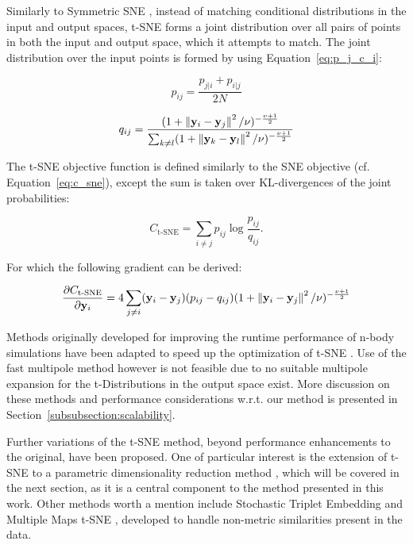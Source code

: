 Similarly to Symmetric SNE \cite{symmetric_sne}, instead of matching conditional distributions in the input and output spaces, t-SNE forms a joint distribution over all pairs of points in both the input and output space, which it attempts to match. The joint distribution over the input points is formed by using Equation~\ref{eq:p_j_c_i}:

$$p_{ij} = \frac{p_{j \vert i} + p_{i \vert j}}{2 N}$$

$$q_{ij} = \frac{(1 + \left\lVert\mathbf{y}_i - \mathbf{y}_j\right\rVert^2 / \nu)^{-\frac{\nu + 1}{2}}}{\sum_{k \neq l} (1 + \left\lVert\mathbf{y}_k - \mathbf{y}_l\right\rVert^2 / \nu)^{-\frac{\nu + 1}{2}}}$$

The t-SNE objective function is defined similarly to the SNE objective (cf. Equation~\ref{eq:c_sne}), except the sum is taken over KL-divergences of the joint probabilities:

$$C_{\text{t-SNE}} = \sum_{i \neq j} p_{ij} \log \frac{p_{ij}}{q_{ij}}.$$

For which the following gradient can be derived:

\begin{equation}
\frac{\partial C_{\text{t-SNE}}}{\partial \mathbf{y}_i} = 4 \sum_{j \neq i} (\mathbf{y}_i - \mathbf{y}_j)(p_{ij} - q_{ij})(1 + \left\lVert\mathbf{y}_i - \mathbf{y}_j\right\rVert^2 / \nu)^{-\frac{\nu + 1}{2}}
\label{eq:c_tsne_grad}
\end{equation}

Methods originally developed for improving the runtime performance of n-body simulations have been adapted to speed up the optimization of t-SNE \cite{accelerated_tsne_1, accelerated_tsne_2}. Use of the fast multipole method \cite{fast_multipole} however is not feasible due to no suitable multipole expansion for the t-Distributions in the output space exist. More discussion on these methods and performance considerations w.r.t. our method is presented in Section~\ref{subsubsection:scalability}.

Further variations of the t-SNE method, beyond performance enhancements to the original, have been proposed. One of particular interest is the extension of t-SNE to a parametric dimensionality reduction method \cite{parametric_tsne}, which will be covered in the next section, as it is a central component to the method presented in this work. Other methods worth a mention include Stochastic Triplet Embedding \cite{stochastic_triplet_embedding} and Multiple Maps t-SNE \cite{multiple_maps_tsne}, developed to handle non-metric similarities present in the data.

